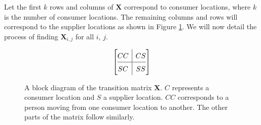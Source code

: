 \documentclass[twoside,twocolumn]{article}
\begin{document}

Let the first $k$ rows and columns of $\textbf{X}$ correspond to consumer locations, where $k$ is the number of consumer locations.
The remaining columns and rows will correspond to the supplier locations as shown in Figure \ref{fig:block_diagram}.
We will now detail the process of finding $\textbf{X}_{i, j}$ for all $i$, $j$.

\begin{figure}
\[
\renewcommand{\arraystretch}{1.5}
\left[\begin{array}{@{}c|c@{}}
  CC &
  CS
\\ \hline
  SC
  & SS
\end{array}\right]
\]
\caption{A block diagram of the transition matrix \textbf{X}. 
$C$ represents a consumer location and $S$ a supplier location.
$CC$ corresponds to a person moving from one consumer location to another.
The other parts of the matrix follow similarly.
}
\label{fig:block_diagram}
\end{figure}
\end{document}
